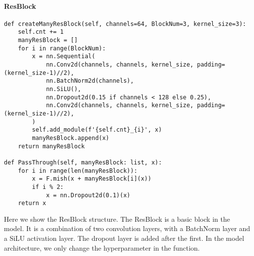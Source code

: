 \documentclass[a4 paper,12pt]{article}
\theoremstyle{definitionstyle}
\begin{document}
\paragraph{ResBlock}
\begin{verbatim}
def createManyResBlock(self, channels=64, BlockNum=3, kernel_size=3):
    self.cnt += 1
    manyResBlock = []
    for i in range(BlockNum):
        x = nn.Sequential(
            nn.Conv2d(channels, channels, kernel_size, padding=(kernel_size-1)//2),
            nn.BatchNorm2d(channels),
            nn.SiLU(),
            nn.Dropout2d(0.15 if channels < 128 else 0.25),
            nn.Conv2d(channels, channels, kernel_size, padding=(kernel_size-1)//2),
        )
        self.add_module(f'{self.cnt}_{i}', x)
        manyResBlock.append(x)
    return manyResBlock

def PassThrough(self, manyResBlock: list, x):
    for i in range(len(manyResBlock)):
        x = F.mish(x + manyResBlock[i](x))
        if i % 2:
            x = nn.Dropout2d(0.1)(x)
    return x
\end{verbatim}
Here we show the ResBlock structure. The ResBlock is a basic block in the model. It is a combination of two convolution layers, with a BatchNorm layer and a SiLU activation layer. The dropout layer is added after the first. In the model architecture, we only change the hyperparameter in the function.
\end{document}

